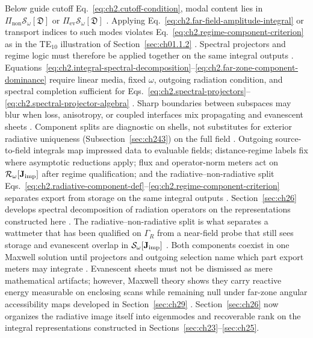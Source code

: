 Below guide cutoff Eq.~\eqref{eq:ch2.cutoff-condition}, modal content lies in
\(\Pi_{\mathrm{non}}\mathcal{S}_\omega[\mathfrak{D}]\) or
\(\Pi_{\mathrm{ev}}\mathcal{S}_\omega[\mathfrak{D}]\) \cite{stratton1941}. Applying
Eq.~\eqref{eq:ch2.far-field-amplitude-integral} or transport indices to such modes violates
Eq.~\eqref{eq:ch2.regime-component-criterion} as in the TE\(_{10}\) illustration of
Section~\ref{sec:ch01.1.2} \cite{harrington2001}. Spectral projectors and regime logic must
therefore be applied together on the same integral outputs \cite{stratton1941}.
Equations~\eqref{eq:ch2.integral-spectral-decomposition}--\eqref{eq:ch2.far-zone-component-dominance}
require linear media, fixed \(\omega\), outgoing radiation condition, and spectral completion sufficient
for Eqs.~\eqref{eq:ch2.spectral-projectors}--\eqref{eq:ch2.spectral-projector-algebra}
\cite{stratton1941}. Sharp boundaries between subspaces may blur when
loss, anisotropy, or coupled interfaces mix propagating and evanescent sheets
\cite{stratton1941}. Component splits are diagnostic on shells, not substitutes for
exterior radiative uniqueness (Subsection~\ref{sec:ch243}) on the full field
\cite{harrington2001}.
Outgoing source-to-field integrals map impressed data to evaluable fields; distance-regime
labels fix where asymptotic reductions apply; flux and operator-norm meters act on
$\mathcal{R}_\omega[\mathbf{J}_{\mathrm{imp}}]$ after regime qualification; and the radiative--non-radiative split
Eqs.~\eqref{eq:ch2.radiative-component-def}--\eqref{eq:ch2.regime-component-criterion}
separates export from storage on the same integral outputs \cite{stratton1941}. Section~\ref{sec:ch26}
develops spectral decomposition of radiation operators on the representations constructed here
\cite{harrington2001}.
The radiative--non-radiative split is what separates a wattmeter that has been qualified on $\Gamma_R$ from a near-field probe that still sees storage and evanescent overlap in $\mathcal{S}_\omega[\mathbf{J}_{\mathrm{imp}}]$ \cite{harrington2001}. Both components coexist in one Maxwell solution until projectors and outgoing selection name which part export meters may integrate \cite{poynting1884}. Evanescent sheets must not be dismissed as mere mathematical artifacts; however, Maxwell theory shows they carry reactive energy measurable on enclosing scans while remaining null under far-zone angular accessibility maps developed in Section~\ref{sec:ch29} \cite{stratton1941}. Section~\ref{sec:ch26} now organizes the radiative image itself into eigenmodes and recoverable rank on the integral representations constructed in Sections~\ref{sec:ch23}--\ref{sec:ch25}.
